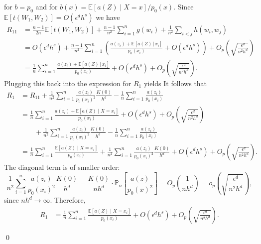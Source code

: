 \documentclass[11pt]{article}
\begin{document}
for $b=p_0$ and for $b(x)=\mathbb{E}[a(Z)\mid X=x]/p_0(x)$. Since $\mathbb{E}[t(W_1, W_2)] = O(\epsilon^dh^s)$ we have
\begin{align*}
    R_{11} &= \frac{n-1}{2n}\mathbb{E}[t(W_1, W_2)] + \frac{n-1}{n^2}\sum_{i = 1}^n g(w_i) + \frac{1}{n^2}\sum_{i < j}h(w_i, w_j) \\
    &= O(\epsilon^d h^s) + \frac{n-1}{n^2} \sum_{i = 1}^n \left(\frac{a(z_i) + \mathbb{E}[a(Z)\,| \,x_i]}{p_0(x_i)} + O(\epsilon^dh^s)\right) + O_p\left( \sqrt{\frac{\epsilon^d}{n^2h^d}}\right) \\
    &= \frac{1}{n}\sum_{i = 1}^n \frac{a(z_i) + \mathbb{E}[a(Z)\,| \,x_i]}{p_0(x_i)} + O(\epsilon^dh^s) + O_p\left( \sqrt{\frac{\epsilon^d}{n^2h^d}}\right).
\end{align*}
Plugging this back into the expression for $R_1$ yields
It follows that
\begin{align*}
    R_1
    &= R_{11} + \frac{1}{n^2}\sum_{i = 1}^n \frac{a(z_i)}{p_0(x_i)^2}\frac{K(0)}{h^d}
    - \frac{1}{n}\sum_{i = 1}^n \frac{a(z_i)}{p_0(x_i)} \\
    &= \frac{1}{n}\sum_{i = 1}^n \frac{a(z_i) + \mathbb{E}[a(Z)\mid X = x_i]}{p_0(x_i)}
    + O(\epsilon^d h^s) + O_p\left(\sqrt{\frac{\epsilon^d}{n^2 h^d}}\right) \\
    &\qquad + \frac{1}{n^2}\sum_{i = 1}^n \frac{a(z_i)}{p_0(x_i)^2}\frac{K(0)}{h^d}
    - \frac{1}{n}\sum_{i = 1}^n \frac{a(z_i)}{p_0(x_i)} \\
    &= \frac{1}{n}\sum_{i = 1}^n \frac{\mathbb{E}[a(Z)\mid X = x_i]}{p_0(x_i)}
    + \frac{1}{n^2}\sum_{i = 1}^n \frac{a(z_i)}{p_0(x_i)^2}\frac{K(0)}{h^d}
    + O(\epsilon^d h^s) + O_p\left(\sqrt{\frac{\epsilon^d}{n^2 h^d}}\right).
\end{align*}
The diagonal term is of smaller order:
\[
\frac{1}{n^2}\sum_{i = 1}^n \frac{a(z_i)}{p_0(x_i)^2}\frac{K(0)}{h^d}
=
\frac{K(0)}{n h^d} \cdot \mathbb{P}_n\left[\frac{a(z)}{p_0(x)^2}\right]
=
O_p\left(\frac{1}{n h^d}\right)
=
o_p\left(\sqrt{\frac{\epsilon^d}{n^2 h^d}}\right),
\]
since \(n h^d \to \infty\). Therefore,
\begin{align*}
    R_1
    &= \frac{1}{n}\sum_{i = 1}^n \frac{\mathbb{E}[a(Z)\mid X = x_i]}{p_0(x_i)}
    + O(\epsilon^d h^s) + O_p\left(\sqrt{\frac{\epsilon^d}{n^2 h^d}}\right).
\end{align*}

\qed{}
\end{document}
